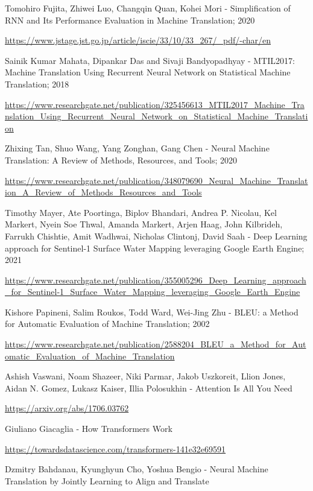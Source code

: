 \begin{thebibliography}{}
		 Tomohiro Fujita, Zhiwei Luo, Changqin Quan, Kohei Mori - Simplification of RNN and Its Performance Evaluation in Machine Translation; 2020
		
		\url{https://www.jstage.jst.go.jp/article/iscie/33/10/33_267/_pdf/-char/en}
		
		 Sainik Kumar Mahata, Dipankar Das and Sivaji Bandyopadhyay -  MTIL2017: Machine Translation Using Recurrent Neural Network on Statistical Machine Translation; 2018
		
		\url{https://www.researchgate.net/publication/325456613_MTIL2017_Machine_Translation_Using_Recurrent_Neural_Network_on_Statistical_Machine_Translation}
		
		 Zhixing Tan, Shuo Wang, Yang Zonghan, Gang Chen - Neural Machine Translation: A Review of Methods, Resources, and Tools; 2020
		
		\url{https://www.researchgate.net/publication/348079690_Neural_Machine_Translation_A_Review_of_Methods_Resources_and_Tools}
		
		 Timothy Mayer, Ate Poortinga, Biplov Bhandari, Andrea P. Nicolau, Kel Markert, Nyein Soe Thwal, Amanda Markert, Arjen Haag, John Kilbrideh, Farrukh Chishtie, Amit Wadhwai, Nicholas Clintonj, David Saah - Deep Learning approach for Sentinel-1 Surface Water Mapping leveraging Google Earth Engine; 2021
		
		\url{https://www.researchgate.net/publication/355005296_Deep_Learning_approach_for_Sentinel-1_Surface_Water_Mapping_leveraging_Google_Earth_Engine}
		
		 Kishore Papineni, Salim Roukos, Todd Ward, Wei-Jing Zhu - BLEU: a Method for Automatic Evaluation of Machine Translation; 2002
		
		\url{https://www.researchgate.net/publication/2588204_BLEU_a_Method_for_Automatic_Evaluation_of_Machine_Translation}
		
		 Ashish Vaswani, Noam Shazeer, Niki Parmar, Jakob Uszkoreit, Llion Jones, Aidan N. Gomez, Lukasz Kaiser, Illia Polosukhin - Attention Is All You Need
		
		\url{https://arxiv.org/abs/1706.03762}
		
		 Giuliano Giacaglia - How Transformers Work
		
		\url{https://towardsdatascience.com/transformers-141e32e69591}
		
		 Dzmitry Bahdanau, Kyunghyun Cho, Yoshua Bengio - Neural Machine Translation by Jointly Learning to Align and Translate
		

\end{thebibliography}
